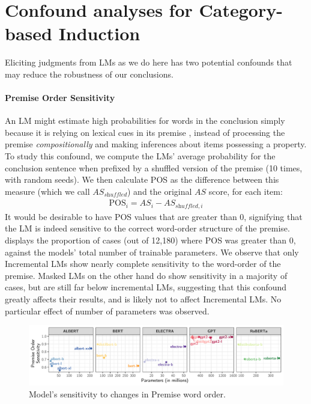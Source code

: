 \documentclass[a4paper, 11pt]{article}
\begin{document}
\section{Confound analyses for Category-based Induction}
Eliciting judgments from LMs as we do here has two potential confounds that may reduce the robustness of our conclusions.

\paragraph{Premise Order Sensitivity}

An LM might estimate high probabilities for words in the conclusion simply because it is relying on lexical cues in its premise \citep{misra-etal-2020-exploring}, instead of processing the premise \textit{compositionally} and making inferences about items possessing a property. 
To study this confound, we compute the LMs' average probability for the conclusion sentence when prefixed by a shuffled version of the premise (10 times, with random seeds). We then calculate POS as the difference between this measure (which we call $AS_{\textit{shuffled}}$) and the original $AS$ score, for each item:
\begin{align}
    \text{POS}_i = AS_i - AS_{\textit{shuffled}, i}
\end{align}
It would be desirable to have POS values that are greater than 0, signifying that the LM is indeed sensitive to the correct word-order structure of the premise.  displays the proportion of cases (out of 12{,}180) where POS was greater than 0, against the models' total number of trainable parameters. 
We observe that only Incremental LMs show nearly complete sensitivity to the word-order of the premise. 
Masked LMs on the other hand do show sensitivity in a majority of cases, but are still far below incremental LMs, suggesting that this confound greatly affects their results, and is likely not to affect Incremental LMs. 
No particular effect of number of parameters was observed.

\begin{figure}[!th]
    \includegraphics[width = \textwidth]{../paper/pos_confound.pdf}
    \caption{Model's sensitivity to changes in Premise word order.}
    \label{fig:cogsci21pos}
\end{figure}
\end{document}
